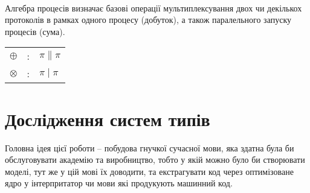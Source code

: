 \begin{prooftree}
\end{prooftree}

\begin{prooftree}
\end{prooftree}

\begin{prooftree}
\end{prooftree}
\paragraph{}

    \paragraph{}
    Алгебра процесів визначає базові операції мультиплексування двох чи декількох
    протоколів в рамках одного процесу (добуток), а також паралельного запуску процесів (сума).

\begin{center}
\begin{tabular}{lcl}
$\oplus$   &:& $\pi \parallel \pi$\\
$\otimes$  &:& $\pi \mid \pi$\\
\end{tabular}
\end{center}

\newpage
\section{Дослідження систем типів}
Головна ідея цієї роботи -- побудова гнучкої сучасної мови,
яка здатна була би обслуговувати академію та виробництво,
тобто у якій можно було би створювати моделі, тут же у цій мові їх доводити,
та екстрагувати код через оптимізоване ядро у інтерпритатор чи мови які продукують машинний код.

